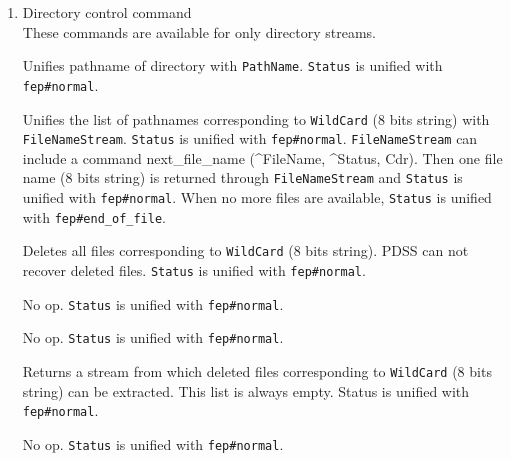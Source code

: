 \begin{enumerate}
\begin{itemize}
\verb|Status| is unified with \verb|fep#yes| when the end of file
has been encountered. Otherwise, it is unified with \verb|fep#no|.

Unifies file pathname with \verb|PathName|. \verb|Status| is unified with
\verb|fep#normal|.

\end{itemize}
\item Directory control command\\

These commands are available for only directory streams.
\begin{itemize}

Unifies pathname of directory with \verb|PathName|. \verb|Status|
is unified with  \verb|fep#normal|.

Unifies the list of pathnames corresponding to \verb|WildCard| (8 bits string)
with \verb|FileNameStream|. \verb|Status| is unified with \verb|fep#normal|. 
\verb|FileNameStream| can include a command
next_file_name (^FileName, ^Status, Cdr).
Then one file name (8 bits string) is returned through
\verb|FileNameStream| and \verb|Status| is unified with \verb|fep#normal|.
When no more files are available, \verb|Status| is unified with
\verb|fep#end_of_file|.

Deletes all files corresponding to \verb|WildCard| (8 bits string). PDSS
can not recover deleted files. \verb|Status| is unified with
\verb|fep#normal|.

No op. \verb|Status| is unified with \verb|fep#normal|.

No op. \verb|Status| is unified with \verb|fep#normal|.

Returns a stream from which deleted files corresponding to \verb|WildCard|
(8 bits string) can be extracted.
This list is always empty. Status is unified with \verb|fep#normal|.

No op. \verb|Status| is unified with \verb|fep#normal|.

\end{itemize}
\end{enumerate}

